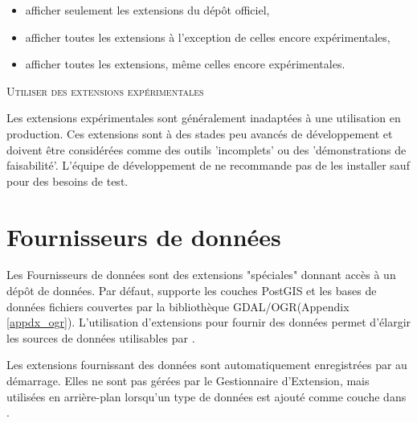 \begin{itemize}[label=--]
\item afficher seulement les extensions du dépôt officiel,
\item afficher toutes les extensions à l'exception de celles encore expérimentales,
\item afficher toutes les extensions, même celles encore expérimentales.
\end{itemize}

\begin{Tip}
 \caption{\textsc{Utiliser des extensions expérimentales}}

Les extensions expérimentales sont généralement inadaptées à une utilisation en production. Ces extensions sont à des stades peu avancés de développement et doivent être considérées comme des outils 'incomplets' ou des 'démonstrations de faisabilité'. L'équipe de développement de \qg ne recommande pas de les installer sauf pour des besoins de test.
\end{Tip}


\section{Fournisseurs de données}


Les Fournisseurs de données sont des extensions "spéciales" donnant accès à un dépôt de données.
Par défaut, \qg supporte les couches PostGIS et les bases de données fichiers couvertes par la bibliothèque GDAL/OGR(Appendix \ref{appdx_ogr}).
L'utilisation d'extensions pour fournir des données permet d'élargir les sources de données utilisables par \qg.

Les extensions fournissant des données sont automatiquement enregistrées par \qg au démarrage.
Elles ne sont pas gérées par le Gestionnaire d'Extension, mais utilisées en arrière-plan lorsqu'un type de données est ajouté comme couche dans \qg.
